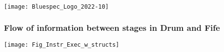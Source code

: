 


\date{L9: {\BSV}: Finite State Machines/StmtFSM}





\begin{frame}
 \titlepage

 \begin{center}
  \texttt{[image: Bluespec\_Logo\_2022-10]}
 \end{center}

\end{frame}





\begin{frame}
\frametitle{Flow of information between stages in Drum and Fife}

\footnotesize

\begin{center}
\texttt{[image: Fig\_Instr\_Exec\_w\_structs]}
\end{center}

\end{frame}


